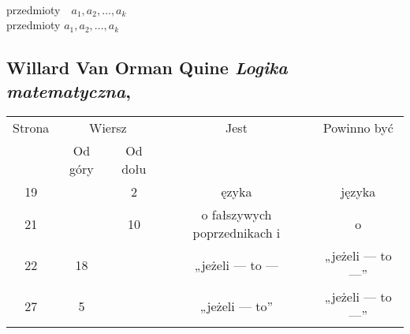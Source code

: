 \documentclass[a4paper,11pt]{article}
\numberwithin{equation}{section}
\begin{document}
\VerSpaceSix


\noindent
{} \\
\Jest przedmioty~~$a_{ 1 }, a_{ 2 }, \ldots, a_{ k }$ \\
\PowinnoByc przedmioty $a_{ 1 }, a_{ 2 }, \ldots, a_{ k }$ \\













\newpage

\subsection{Willard Van Orman Quine \textit{Logika matematyczna},
  \cite{Quine-Logika-matematyczna-Wyd-1974}}




\begin{center}

  \begin{tabular}{|c|c|c|c|c|}
    \hline
    Strona & \multicolumn{2}{c|}{Wiersz} & Jest
                              & Powinno być \\ \cline{2-3}
    & Od góry & Od dołu & & \\
    \hline
    19  & &  2 & ęzyka & języka \\
    21  & & 10 & o fałszywych poprzednikach i & o \\
    22  & 18 & & „jeżeli --- to --- & „jeżeli --- to ---” \\
    27  &  5 & & „jeżeli --- to” & „jeżeli --- to ---” \\
    \hline
  \end{tabular}

\end{center}

\VerSpaceSix


\end{document}
